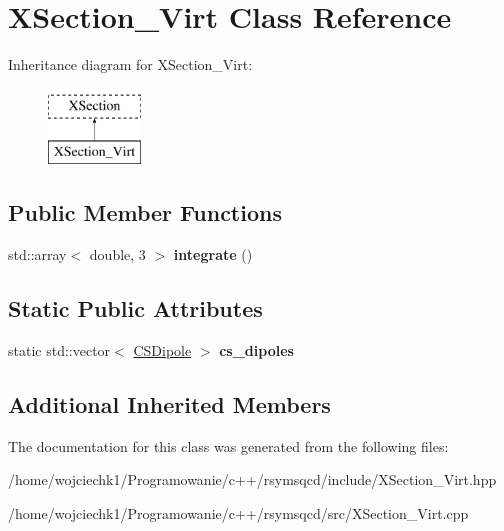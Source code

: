 \hypertarget{classXSection__Virt}{}\section{X\+Section\+\_\+\+Virt Class Reference}
\label{classXSection__Virt}
Inheritance diagram for X\+Section\+\_\+\+Virt\+:\begin{figure}[H]
\begin{center}
\leavevmode
\includegraphics[height=2.000000cm]{classXSection__Virt}
\end{center}
\end{figure}
\subsection*{Public Member Functions}
\begin{DoxyCompactItemize}
\item 
\mbox{\label{classXSection__Virt_a5a691c6860054b2608b234c9755a1fbb}} 
std\+::array$<$ double, 3 $>$ {\bfseries integrate} ()
\end{DoxyCompactItemize}
\subsection*{Static Public Attributes}
\begin{DoxyCompactItemize}
\item 
\mbox{\label{classXSection__Virt_ae2d09c66ecbe84e262b2986a9665bc8b}} 
static std\+::vector$<$ \hyperlink{classCSDipole}{C\+S\+Dipole} $>$ {\bfseries cs\+\_\+dipoles}
\end{DoxyCompactItemize}
\subsection*{Additional Inherited Members}


The documentation for this class was generated from the following files\+:\begin{DoxyCompactItemize}
\item 
/home/wojciechk1/\+Programowanie/c++/rsymsqcd/include/X\+Section\+\_\+\+Virt.\+hpp\item 
/home/wojciechk1/\+Programowanie/c++/rsymsqcd/src/X\+Section\+\_\+\+Virt.\+cpp\end{DoxyCompactItemize}
